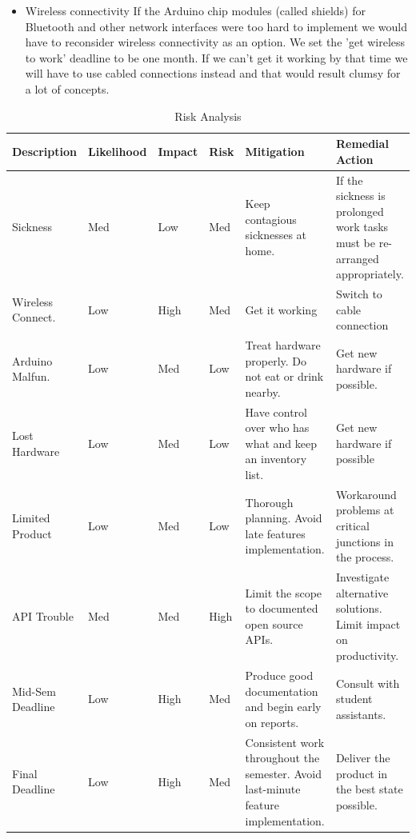 \begin{itemize}
\item{Wireless connectivity}\newline
If the Arduino chip modules (called shields) for Bluetooth and other network interfaces were too
hard to implement we would have to reconsider wireless connectivity as an option.
We set the 'get wireless to work' deadline to be one month. If we can't get it working
by that time we will have to use cabled connections instead and that would result clumsy
for a lot of concepts.
\end{itemize}

\begin{table}
	\begin{center}
		\caption{Risk Analysis}
		\begin{tabular}{| l | l | l | l | p{2.8cm} | p{3cm} |}
		\hline

\textbf{Description} & \textbf{Likelihood} & \textbf{Impact} & \textbf{Risk} & \textbf{Mitigation} & \textbf{Remedial Action}\\ \hline

Sickness 			& Med & Low & Med & Keep contagious sicknesses at home.
					& If the sickness is prolonged work tasks must be re-arranged appropriately. \\ \hline

Wireless Connect.	& Low & High & Med & Get it working & Switch to cable connection \\ \hline

Arduino Malfun.		& Low & Med & Low & Treat hardware properly. Do not eat or drink nearby.
					&  Get new hardware if possible.\\ \hline

Lost Hardware		& Low & Med & Low & Have control over who has what and keep an inventory list.
					& Get new hardware if possible \\ \hline

Limited Product		& Low & Med & Low & Thorough planning. Avoid late features implementation.
					&  Workaround problems at critical junctions in the process.\\ \hline

API Trouble			& Med & Med & High & Limit the scope to documented open source APIs.
					& Investigate alternative solutions. Limit impact on productivity. \\ \hline

Mid-Sem Deadline	& Low & High & Med & Produce good documentation and begin early on reports.
					&  Consult with student assistants.\\ \hline
			
Final Deadline		& Low & High & Med & Consistent work throughout the semester. Avoid last-minute feature implementation.
					&  Deliver the product in the best state possible.\\ \hline

		\end{tabular}
	\end{center}	
	\label{table:riskanalysis}
\end{table}

